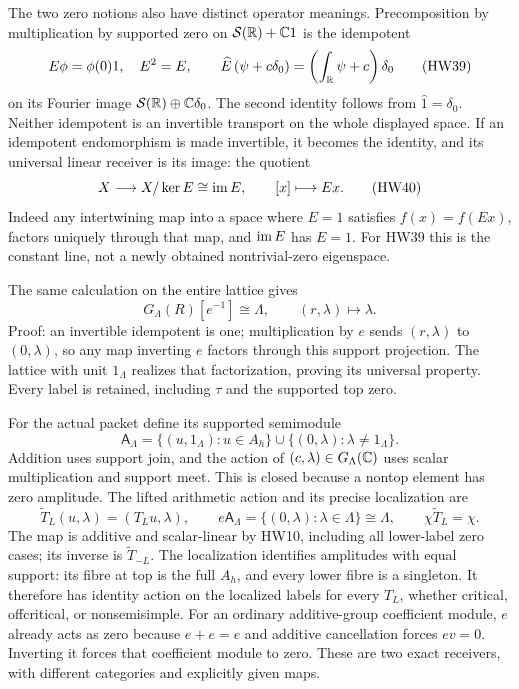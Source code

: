 The two zero notions also have distinct operator meanings.
Precomposition by multiplication by supported zero on
\(\mathcal S(\mathbb R)+\mathbb C1\) is the idempotent
\[
 E\phi=\phi(0)1,\quad E^2=E,\qquad
 \widehat E\,(\psi+c\delta_0)
       =\left(\int_\mathbb R\psi+c\right)\delta_0
 \tag{HW39}
\]
on its Fourier image \(\mathcal S(\mathbb R)\oplus\mathbb C\delta_0\).
The second identity follows from \(\widehat1=\delta_0\).
Neither idempotent is an invertible transport on the whole
displayed space. If an idempotent endomorphism is made
invertible, it becomes the identity, and its universal linear
receiver is its image: the quotient
\[
 X\longrightarrow X/\ker E\cong\operatorname{im} E,\qquad [x]\longmapsto Ex .
 \tag{HW40}
\]
Indeed any intertwining map into a space where \(E=1\)
satisfies \(f(x)=f(Ex)\), factors uniquely through that map,
and \(\operatorname{im} E\) has \(E=1\). For HW39 this is the constant
line, not a newly obtained nontrivial-zero eigenspace.

The same calculation on the entire lattice gives
\[
 G_\Lambda(R)[e^{-1}]\cong\Lambda,\qquad
 (r,\lambda)\longmapsto\lambda .
 \tag{HW41}\label{hw:localization}
\]
Proof: an invertible idempotent is one; multiplication by
\(e\) sends \((r,\lambda)\) to \((0,\lambda)\), so any map
inverting \(e\) factors through this support projection.
The lattice with unit \(1_\Lambda\) realizes that factorization,
proving its universal property. Every label is retained,
including \(\tau\) and the supported top zero.

For the actual packet define its supported semimodule
\[
 \mathsf A_\Lambda
 =\{(u,1_\Lambda):u\in A_h\}
          \cup\{(0,\lambda):\lambda\ne1_\Lambda\}.
 \tag{HW42}
\]
Addition uses support join, and the action of
\((c,\lambda)\in G_\Lambda(\mathbb C)\) uses scalar multiplication
and support meet. This is closed because a nontop element
has zero amplitude. The lifted arithmetic action and its
precise localization are
\[
 \widetilde T_L(u,\lambda)=(T_Lu,\lambda),\qquad
 e\mathsf A_\Lambda=\{(0,\lambda):\lambda\in\Lambda\}
       \cong\Lambda,\qquad
 \chi\widetilde T_L=\chi.
 \tag{HW43}
\]
The map is additive and scalar-linear by HW10, including
all lower-label zero cases; its inverse is \(\widetilde T_{-L}\).
The localization identifies amplitudes with equal support:
its fibre at top is the full \(A_h\), and every lower fibre
is a singleton. It therefore has identity action on the
localized labels for every \(T_L\), whether critical,
offcritical, or nonsemisimple.
For an ordinary additive-group coefficient module, \(e\)
already acts as zero because \(e+e=e\) and additive
cancellation forces \(ev=0\). Inverting it forces that
coefficient module to zero. These are two exact receivers,
with different categories and explicitly given maps.

